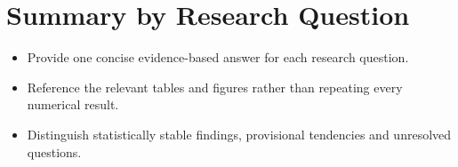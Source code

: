 \documentclass[]{UCD_CS_MSc_AAI_Report}
\newcommand{\challenge}[1]{{\color{red}#1}}
\newcommand{\limitation}[1]{{\color{orange}#1}}
\newcommand{\validation}[1]{{\color{yellow!60!olive}#1}}
\newcommand{\researchnotes}{\paragraph{Research notes and evidence.}}
\newcommand{\resultplaceholder}{\paragraph{Results to insert.}}
\begin{document}


\section{Summary by Research Question}
\label{sec:results-rq-summary}
\begin{itemize}
    \item Provide one concise evidence-based answer for each research question.
    \item Reference the relevant tables and figures rather than repeating every numerical result.
    \item Distinguish statistically stable findings, provisional tendencies and unresolved questions.
\end{itemize}
\end{document}
